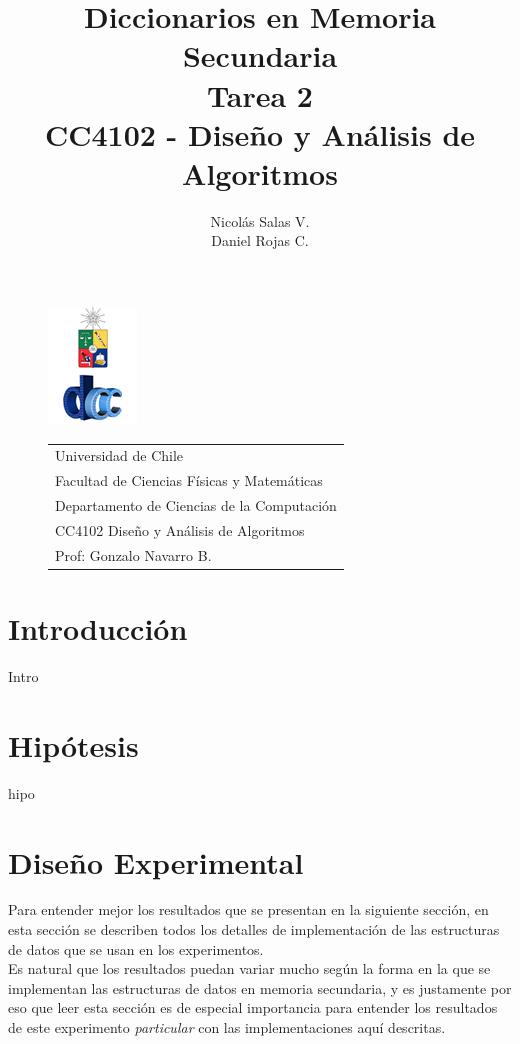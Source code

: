\documentclass[12pt,letterpaper]{report}
\title{\Huge Diccionarios en Memoria Secundaria \\ Tarea 2 \\ CC4102 - Diseño y Análisis de Algoritmos}
\author{Nicolás Salas V.\\Daniel Rojas C.}
\begin{document}
\pagestyle{empty}
\begin{figure}[t]
\includegraphics[scale=0.83]{logo.png}
\begin{tabular}{l}
\small Universidad de Chile\\
\small Facultad de Ciencias Físicas y Matemáticas\\
\small Departamento de Ciencias de la Computación\\
\small CC4102 Diseño y Análisis de Algoritmos\\
\small Prof: Gonzalo Navarro B.
\vspace{2.3cm}
\end{tabular}
\end{figure}

\maketitle

\tableofcontents
\newpage

\section{Introducción}

Intro

\section{Hipótesis}
hipo

\section{Diseño Experimental}

Para entender mejor los resultados que se presentan en la siguiente sección, en esta sección se describen todos los detalles de implementación de las estructuras de datos que se usan en los experimentos.\\

Es natural que los resultados puedan variar mucho según la forma en la que se implementan las estructuras de datos en memoria secundaria, y es justamente por eso que leer esta sección es de especial importancia para entender los resultados de este experimento \emph{particular} con las implementaciones aquí descritas.
\end{document}

